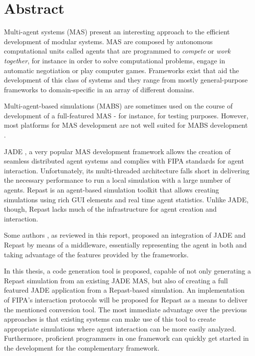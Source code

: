 \chapter*{Abstract}

Multi-agent systems (MAS) present an interesting approach to the efficient development of modular systems. MAS are composed by autonomous computational units called agents that are programmed to \emph{compete} or \emph{work together}, for instance in order to solve computational problems, engage in automatic negotiation or play computer games. Frameworks exist that aid the development of this class of systems and they range from mostly general-purpose frameworks to domain-specific in an array of different domains.

Multi-agent-based simulations (MABS) are sometimes used on the course of development of a full-featured MAS - for instance, for testing purposes. However, most platforms for MAS development are not well suited for MABS development \cite{mengistu2008scalability}.

JADE \cite{bellifemine2003jade}, a very popular MAS development framework allows the creation of seamless distributed agent systems and complies with FIPA standards for agent interaction. Unfortunately, its multi-threaded architecture falls short in delivering the necessary performance to run a local simulation with a large number of agents. Repast \cite{collier2003repast} is an agent-based simulation toolkit that allows creating simulations using rich GUI elements and real time agent statistics. Unlike JADE, though, Repast lacks much of the infrastructure for agent creation and interaction.

Some authors \cite{garcia2011misia,gormer2011jrep}, as reviewed in this report, proposed an integration of JADE and Repast by means of a middleware, essentially representing the agent in both and taking advantage of the features provided by the frameworks.

In this thesis, a code generation tool is proposed, capable of not only generating a Repast simulation from an existing JADE MAS, but also of creating a full featured JADE application from a Repast-based simulation. An implementation of FIPA's interaction protocols will be proposed for Repast as a means to deliver the mentioned conversion tool. The most immediate advantage over the previous approaches is that existing systems can make use of this tool to create appropriate simulations where agent interaction can be more easily analyzed. Furthermore, proficient programmers in one framework can quickly get started in the development for the complementary framework.

